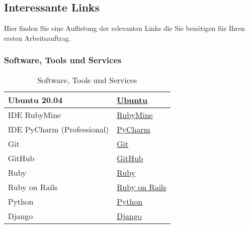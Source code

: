 \subsection{Interessante Links}\label{subsec:links}
\begin{frame}[fragile]
    Hier finden Sie eine Auflistung der relevanten Links die Sie benötigen für Ihren ersten Arbeitsauftrag.
\end{frame}


\begin{frame}[fragile]
    \frametitle<presentation>{Software, Tools und Services}
    \begin{table}[h!]
        \centering
        \begin{tabularx}{0.8\textwidth} {
        | >{\raggedright\arraybackslash}X
        | >{\raggedright\arraybackslash}X | }
            \hline
            Ubuntu 20.04               & \href{https://ubuntu.com/}{Ubuntu}                              \\
            \hline
            IDE RubyMine               & \href{https://www.jetbrains.com/de-de/ruby/}{RubyMine}          \\
            \hline
            IDE PyCharm (Professional) & \href{https://www.jetbrains.com/de-de/pycharm/}{PyCharm}        \\
            \hline
            Git                        & \href{https://git-scm.com/}{Git}                                \\
            \hline
            GitHub                     & \href{https://github.com/}{GitHub}                              \\
            \hline
            Ruby                       & \href{https://www.ruby-lang.org/de/}{Ruby}                      \\
            \hline
            Ruby on Rails              & \href{https://guides.rubyonrails.org/index.html}{Ruby on Rails} \\
            \hline
            Python                     & \href{https://www.python.org/}{Python}                          \\
            \hline
            Django                     & \href{https://www.djangoproject.com/}{Django}                   \\
            \hline
        \end{tabularx}
        \caption{Software, Tools und Services}
        \label{tab:2}
    \end{table}
\end{frame}

